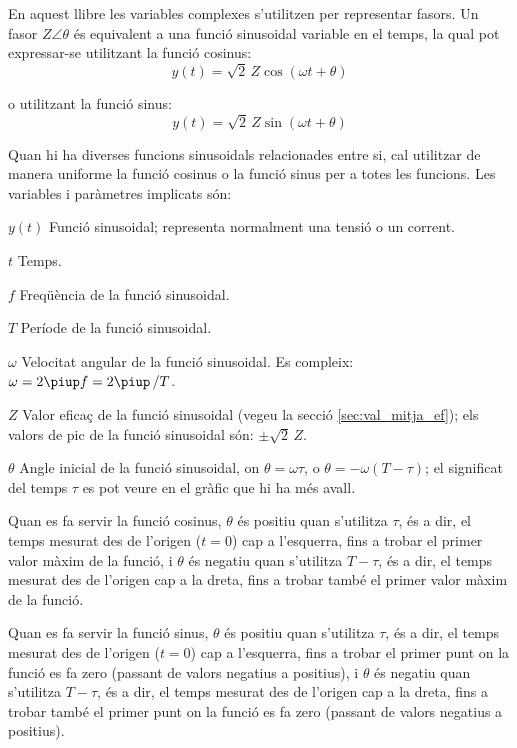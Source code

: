\pagebreak

En aquest llibre les variables complexes s'utilitzen per representar fasors. Un fasor $Z\angle\theta$ és equivalent a una funció sinusoidal variable en el temps, la qual pot expressar-se utilitzant la funció cosinus:
\[y(t)=\sqrt{2}\, Z \cos(\omega t + \theta)\]

o utilitzant la funció sinus:
\[y(t)=\sqrt{2}\, Z \sin(\omega t + \theta)\]

Quan hi ha diverses funcions sinusoidals relacionades entre si, cal utilitzar de manera uniforme la funció cosinus o la funció sinus per a totes les funcions. Les variables i paràmetres implicats són:
\begin{list}{}
{\setlength{\labelwidth}{15mm} \setlength{\leftmargin}{20mm}
\setlength{\labelsep}{5mm}}
    \item[$y(t)$] Funció sinusoidal; representa normalment una tensió o un corrent.
    \item[$t$] Temps.
    \item[$f$] Freqüència de la funció sinusoidal.
    \item[$T$] Període de la funció sinusoidal.
    \item[$\omega$] Velocitat angular de la funció sinusoidal. Es compleix: $\omega = 2 \piup f = 2 \piup\,/T$.
    \item[$Z$] Valor eficaç de la funció sinusoidal (vegeu la secció \vref{sec:val_mitja_ef}); els valors de pic de la funció sinusoidal  són:  $\pm\sqrt{2}\, Z$.
    \item[$\theta$] Angle inicial de la funció sinusoidal, on  $\theta=\omega \tau$, o $\theta=-\omega (T-\tau)$; el significat del temps $\tau$  es pot veure en el gràfic que hi ha més avall.

    Quan es fa servir la funció cosinus, $\theta$ és positiu quan s'utilitza $\tau$, és a dir, el temps mesurat  des de l'origen ($t=0$) cap a l'esquerra, fins a trobar el primer valor màxim de la funció, i $\theta$ és negatiu quan s'utilitza $T-\tau$, és a dir, el temps mesurat des de l'origen cap a la dreta, fins a trobar també el primer valor màxim de la funció.

    Quan es fa servir la funció sinus, $\theta$ és positiu quan s'utilitza $\tau$, és a dir, el temps mesurat des de l'origen ($t=0$) cap a l'esquerra, fins a trobar el primer punt on la funció es fa zero (passant de valors negatius a positius), i $\theta$ és negatiu quan s'utilitza $T-\tau$, és a dir, el temps mesurat des de l'origen cap a la dreta, fins a trobar també el primer punt on la funció es fa zero (passant de valors negatius a positius).
    \item[] 
\end{list}

